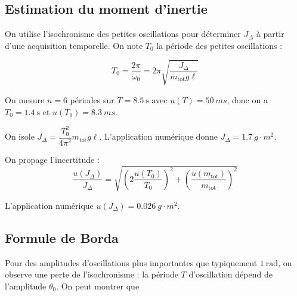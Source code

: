 \documentclass[a4paper,french,bookmarks]{article}
\begin{document}
\subsection{Estimation du moment d'inertie}

On utilise l’isochronisme des petites oscillations pour déterminer $J_\Delta$ à partir d’une acquisition temporelle. On note $T_0$ la période des petites oscillations :

\begin{equation}
    \boxed{T_0 = \dfrac{2\pi}{\omega_0} = 2\pi\sqrt{\dfrac{J_\Delta}{m_\text{tot}g\ell}}}
\end{equation}

\noafter
{}
%
\nobefore\yesafter
%
\begin{expcom}
    On mesure $n = 6$ périodes sur $T = \SI{8.5}{\second}$ avec $u(T) = \SI{50}{ms}$, donc on a $T_0 = \SI{1.4}{\second}$ et $u(T_0) = \SI{8.3}{ms}$.
    
    On isole $J_\Delta = \dfrac{T_0^2}{4\pi^2}m_\text{tot}g\ell$. L'application numérique donne $J_\Delta = \SI{1.7}{g\cdot m^2}$.
    
    On propage l'incertitude :
    \[ \dfrac{u(J_\Delta)}{J_\Delta} = \sqrt{\left(2\dfrac{u(T_0)}{T_0}\right)^2 + \left(\dfrac{u(m_\text{tot})}{m_\text{tot}}\right)^2}\]
    
    L'application numérique $u(J_\Delta) = \SI{0.026}{g \cdot m^2}$.
\end{expcom}
%
\yesbefore

\subsection{Formule de Borda}

Pour des amplitudes d’oscillations plus importantes que typiquement $\SI{1}{\radian}$, on observe une perte de l’isochronisme : la
période $T$ d’oscillation dépend de l’amplitude $\theta_0$. On peut montrer que
\end{document}

